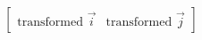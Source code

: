 \documentclass[preview]{standalone}
\begin{document}
\begin{align*}
\begin{bmatrix} \text{transformed }\vec{i} & \text{transformed }\vec{j} \end{bmatrix}
\end{align*}
\end{document}
